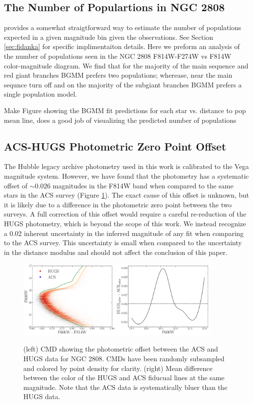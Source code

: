 \subsection{The Number of Populartions in NGC 2808}
\fidanka provides a somewhat straigtforward way to estimate the number of populations expected in a given magnitude bin given the observations. See Section \ref{sec:fidanka} for specific implimentaiton details. Here we preform an analysis of the number of populations seen in the NGC 2808 F814W-F274W vs F814W color-magnitude diagram. We find that for the majority of the main sequence and red giant branches BGMM prefers two populations; wherease, near the main sequnce turn off and on the majority of the subgiant branches BGMM prefers a single population model.

{\color{red} Make Figure showing the BGMM fit predictions for each star vs. distance to pop mean line, does a good job of visualizing the predicted number of populations}


\subsection{ACS-HUGS Photometric Zero Point Offset}
The Hubble legacy archive photometry used in this work is calibrated to the
Vega magnitude system. However, we have found that the photometry has a
systematic offset of $\sim0.026$ magnitudes in the F814W band when
compared to the same stars in the ACS survey (Figure \ref{fig:offset}). The
exact cause of this offset is unknown, but it is likely due to a difference in
the photometric zero point between the two surveys. A full correction of this
offset would require a careful re-reduction of the HUGS photometry, which is
beyond the scope of this work. We instead recognize a 0.02 inherent uncertainty
in the inferred magnitude of any fit when comparing to the ACS survey. This
uncertainty is small when compared to the uncertainty in the
distance modulus and should not affect the conclusion of this
paper. 

\begin{figure}
  \centering
  \includegraphics[width=0.90\textwidth]{src/figures/photometricOffset.pdf}
  \label{fig:offset}
  \caption{(left) CMD showing the photometric offset between the ACS and HUGS data for NGC 2808. CMDs have been randomly subsampled and colored by point density for clarity. (right) Mean difference between the color of the HUGS and ACS fiducual lines at the same magnitude. Note that the ACS data is systematically bluer than the HUGS data.}
\end{figure}

